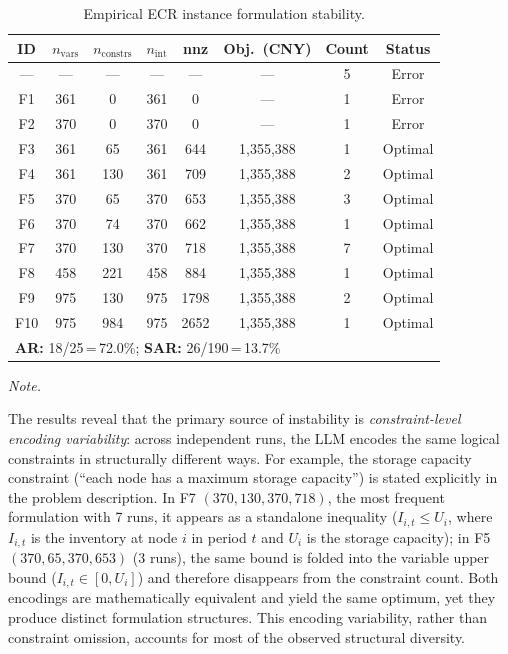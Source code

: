 \documentclass[preprint,12pt]{elsarticle}
\begin{document}
\begin{table}[!htbp]
 \centering
 \small
 \renewcommand{\arraystretch}{1.0}
 \caption{Empirical ECR instance formulation stability.}
 \label{tab:formulation_stability}
 \begin{threeparttable}
 \begin{tabular*}{\textwidth}{@{\extracolsep{\fill}}cccccccc@{}}
 \toprule
 ID & $n_{\text{vars}}$ & $n_{\text{constrs}}$ & $n_{\text{int}}$ & nnz & Obj.\ (CNY) & Count & Status \\
 \midrule
 --- & --- & --- & --- & --- & --- & 5 & Error \\
 F1 & 361 & 0 & 361 & 0 & --- & 1 & Error \\
 F2 & 370 & 0 & 370 & 0 & --- & 1 & Error \\
 F3 & 361 & 65 & 361 & 644 & 1,355,388 & 1 & Optimal \\
 F4 & 361 & 130 & 361 & 709 & 1,355,388 & 2 & Optimal \\
 F5 & 370 & 65 & 370 & 653 & 1,355,388 & 3 & Optimal \\
 F6 & 370 & 74 & 370 & 662 & 1,355,388 & 1 & Optimal \\
 F7 & 370 & 130 & 370 & 718 & 1,355,388 & 7 & Optimal \\
 F8 & 458 & 221 & 458 & 884 & 1,355,388 & 1 & Optimal \\
 F9 & 975 & 130 & 975 & 1798 & 1,355,388 & 2 & Optimal \\
 F10 & 975 & 984 & 975 & 2652 & 1,355,388 & 1 & Optimal \\
 \midrule
 \multicolumn{8}{l}{\textbf{AR:} 18/25\,=\,72.0\%; \textbf{SAR:} 26/190\,=\,13.7\%} \\
 \bottomrule
 \end{tabular*}
 \begin{tablenotes}[flushleft]
 \footnotesize
 \item \textit{Note.} 
 \end{tablenotes}
 \end{threeparttable}
\end{table}

The results reveal that the primary source of instability is \emph{constraint-level encoding variability}: across independent runs, the LLM encodes the same logical constraints in structurally different ways. For example, the storage capacity constraint (``each node has a maximum storage capacity'') is stated explicitly in the problem description. In F7 $(370, 130, 370, 718)$, the most frequent formulation with 7 runs, it appears as a standalone inequality ($I_{i,t} \leq U_i$, where $I_{i,t}$ is the inventory at node $i$ in period $t$ and $U_i$ is the storage capacity); in F5 $(370, 65, 370, 653)$ (3 runs), the same bound is folded into the variable upper bound ($I_{i,t} \in [0, U_i]$) and therefore disappears from the constraint count. Both encodings are mathematically equivalent and yield the same optimum, yet they produce distinct formulation structures. This encoding variability, rather than constraint omission, accounts for most of the observed structural diversity.
\end{document}
